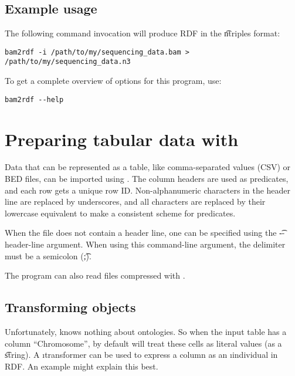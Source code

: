 \subsection{Example usage}

The following command invocation will produce RDF in the \t{ntriples}
format:
\begin{siderules}
\begin{verbatim}
bam2rdf -i /path/to/my/sequencing_data.bam > /path/to/my/sequencing_data.n3
\end{verbatim}
\end{siderules}

To get a complete overview of options for this program, use:
\begin{siderules}
\begin{verbatim}
bam2rdf --help
\end{verbatim}
\end{siderules}

\section{Preparing tabular data with }
\label{sec:table2rdf}

  Data that can be represented as a table, like comma-separated values (CSV)
  or BED files, can be imported using .  The column headers
  are used as predicates, and each row gets a unique row ID.  Non-alphanumeric
  characters in the header line are replaced by underscores, and all characters
  are replaced by their lowercase equivalent to make a consistent scheme for
  predicates.

  When the file does not contain a header line, one can be specified using the
  \t{-{}-header-line} argument.  When using this command-line argument, the
  delimiter must be a semicolon (\t{;}).

  The program can also read files compressed with .

\subsection{Transforming objects}

  Unfortunately,  knows nothing about ontologies.  So when
  the input table has a column ``Chromosome'', by default 
  will treat these cells as literal values (as a \t{string}).  A
  \i{transformer} can be used to express a column as an \i{individual} in
  RDF.  An example might explain this best.

